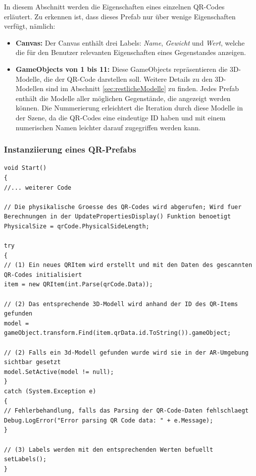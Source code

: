 In diesem Abschnitt werden die Eigenschaften eines einzelnen QR-Codes erläutert. Zu erkennen ist, dass dieses Prefab nur über wenige Eigenschaften verfügt, nämlich:
\begin{itemize}
\item \textbf{Canvas:} Der Canvas enthält drei Labels: \textit{Name}, \textit{Gewicht} und \textit{Wert}, welche die für den Benutzer relevanten Eigenschaften eines Gegenstandes anzeigen.
\item \textbf{GameObjects von 1 bis 11:} Diese GameObjects repräsentieren die 3D-Modelle, die der QR-Code darstellen soll. Weitere Details zu den 3D-Modellen sind im Abschnitt \ref{sec:restlicheModelle} zu finden. Jedes Prefab enthält die Modelle aller möglichen Gegenstände, die angezeigt werden können. Die Nummerierung erleichtert die Iteration durch diese Modelle in der Szene, da die QR-Codes eine eindeutige ID haben und mit einem numerischen Namen leichter darauf zugegriffen werden kann.
\end{itemize}

\subsubsection*{Instanziierung eines QR-Prefabs}

\begin{lstlisting}[style=csharp, caption={Instanzierung eines QR-Prefabs}, label=code:QR-Prefab instanzierung]
void Start()
{
//... weiterer Code

// Die physikalische Groesse des QR-Codes wird abgerufen; Wird fuer Berechnungen in der UpdatePropertiesDisplay() Funktion benoetigt
PhysicalSize = qrCode.PhysicalSideLength;

try
{
// (1) Ein neues QRItem wird erstellt und mit den Daten des gescannten QR-Codes initialisiert
item = new QRItem(int.Parse(qrCode.Data));

// (2) Das entsprechende 3D-Modell wird anhand der ID des QR-Items gefunden
model = gameObject.transform.Find(item.qrData.id.ToString()).gameObject;

// (2) Falls ein 3d-Modell gefunden wurde wird sie in der AR-Umgebung sichtbar gesetzt
model.SetActive(model != null);
}
catch (System.Exception e)
{
// Fehlerbehandlung, falls das Parsing der QR-Code-Daten fehlschlaegt
Debug.LogError("Error parsing QR Code data: " + e.Message);
}

// (3) Labels werden mit den entsprechenden Werten befuellt
setLabels();
}
\end{lstlisting}


